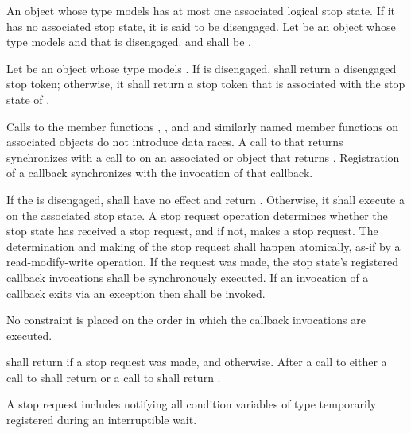 \pnum
An object whose type models  has
at most one associated logical stop state.
If it has no associated stop state, it is said to be disengaged.
Let  be an object whose type models  and
that is disengaged.
 and  shall be .

\pnum
Let  be an object whose type models .
If  is disengaged,
 shall return a disengaged stop token;
otherwise, it shall return
a stop token that is associated with the stop state of .

\pnum
Calls to the member functions
, , and  and
similarly named member functions
on associated  objects
do not introduce data races.
A call to  that returns  synchronizes with
a call to  on
an associated
 or  object
that returns .
Registration of a callback synchronizes with the invocation of that callback.

\pnum
If the  is disengaged,
 shall have no effect and return .
Otherwise, it shall execute a 
on the associated stop state.
A stop request operation determines
whether the stop state has received a stop request, and
if not, makes a stop request.
The determination and making of the stop request shall happen atomically,
as-if by a read-modify-write operation.
If the request was made,
the stop state's registered callback invocations shall be
synchronously executed.
If an invocation of a callback exits via an exception
then  shall be invoked.
\begin{note}
No constraint is placed on the order
in which the callback invocations are executed.
\end{note}
 shall return  if a stop request was made, and
 otherwise.
After a call to  either
a call to  shall return  or
a call to  shall return .
\begin{note}
A stop request includes notifying
all condition variables of type 
temporarily registered during
an interruptible wait.
\end{note}

